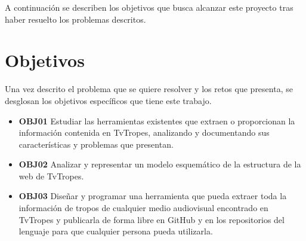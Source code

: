 A continuación se describen los objetivos que busca alcanzar este proyecto tras haber resuelto los problemas descritos.

\section{Objetivos}

Una vez descrito el problema que se quiere resolver y los retos que presenta, se desglosan los objetivos específicos que tiene este trabajo.

\begin{itemize}
    \item \textbf{OBJ01} Estudiar las herramientas existentes que extraen o proporcionan la información contenida en TvTropes, analizando y documentando sus características y problemas que presentan.
    \item \textbf{OBJ02} Analizar y representar un modelo esquemático de la estructura de la web de TvTropes.
    \item \textbf{OBJ03} Diseñar y programar una herramienta que pueda extraer toda la información de tropos de cualquier medio audiovisual encontrado en TvTropes y publicarla de forma libre en GitHub y en los repositorios del lenguaje para que cualquier persona pueda utilizarla.
\end{itemize}


